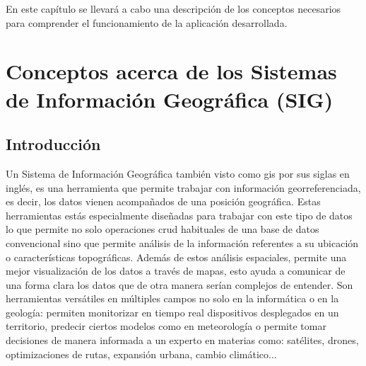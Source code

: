 
En este capítulo se llevará a cabo una descripción de los conceptos necesarios para comprender el funcionamiento de la aplicación desarrollada.

\section{Conceptos acerca de los Sistemas de Información Geográfica (SIG)}
	\subsection{Introducción}
	Un Sistema de Información Geográfica también visto como \acrshort{gis} por sus siglas en inglés, es una herramienta que permite trabajar con información georreferenciada, es decir, los datos vienen acompañados de una posición geográfica. Estas herramientas estás especialmente diseñadas para trabajar con este tipo de datos lo que permite no solo operaciones \acrfull{crud} habituales de una base de datos convencional sino que permite análisis de la información referentes a su ubicación o características topográficas.
	Además de estos análisis espaciales, permite una mejor visualización de los datos a través de mapas, esto ayuda a comunicar de una forma clara los datos que de otra manera serían complejos de entender.
	Son herramientas versátiles en múltiples campos no solo en la informática o en la geología: permiten monitorizar en tiempo real dispositivos desplegados en un territorio, predecir ciertos modelos como en meteorología o permite tomar decisiones de manera informada a un experto en materias como: satélites, drones, optimizaciones de rutas, expansión urbana, cambio climático...
	
	
